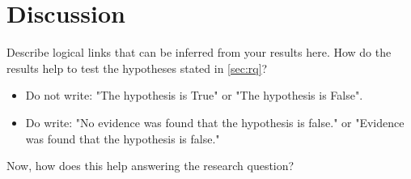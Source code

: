 \chapter{Discussion}
\label{ch:discussion}

Describe logical links that can be inferred from your results here. How do the results help to test the hypotheses stated in \autoref{sec:rq}?

\begin{itemize}
	\item Do not write: "The hypothesis is True" or "The hypothesis is False".
	\item Do write: "No evidence was found that the hypothesis is false." or "Evidence was found that the hypothesis is false."
\end{itemize}



Now, how does this help answering the research question?

